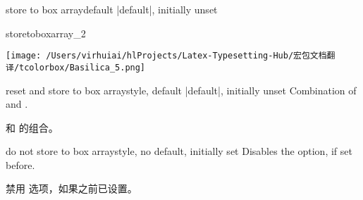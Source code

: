 \begin{docTcbKey}[][doc new=2015-07-13]{store to box array}{}{default |default|, initially unset}
\begin{exdispExample}{storetoboxarray_2}
\begin{tcolorbox}[blanker,width=4cm,
fontupper=\footnotesize,
enforce breakable,%
break at=4cm,
height fixed for=all,
watermark text=\arabic{tcbbreakpart},
reset box array,
store to box array
]
\texttt{[image: /Users/virhuiai/hlProjects/Latex-Typesetting-Hub/宏包文档翻译/tcolorbox/Basilica\_5.png]}\par
\lipsum[1-2]
\end{tcolorbox}

\begin{tcbitemize}[raster columns=3,raster equal height,
size=small,halign=center,sharp corners,colback=blue!5]
\tcbitem{}
\tcbitem{}
\tcbitem{}
\tcbitem{}
\tcbitem{}
\tcbitem{}
\end{tcbitemize}
\end{exdispExample}
\end{docTcbKey}


\begin{docTcbKey}[][doc new=2015-07-13]{reset and store to box array}{}{style, default |default|, initially unset}
Combination of  and .

 和  的组合。
\end{docTcbKey}



\begin{docTcbKey}[][doc new=2015-07-13]{do not store to box array}{}{style, no default, initially set}
Disables the  option, if set before.

禁用  选项，如果之前已设置。
\end{docTcbKey}


